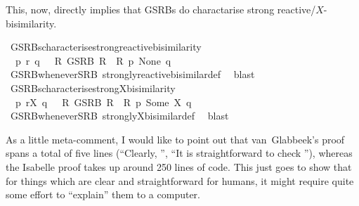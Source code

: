 \begin{isabellebody}
\endisatagproof
{\isafoldproof}%
%
\isadelimproof
%
\endisadelimproof
%
\begin{isamarkuptext}%
This, now, directly implies that GSRBs do charactarise strong reactive/$X$-bisimilarity.%
\end{isamarkuptext}\isamarkuptrue%
%
\isadelimvisible
%
\endisadelimvisible
%
\isatagvisible
{}\isamarkupfalse%
\ GSRBs{\isacharunderscore}{\kern0pt}characterise{\isacharunderscore}{\kern0pt}strong{\isacharunderscore}{\kern0pt}reactive{\isacharunderscore}{\kern0pt}bisimilarity{\isacharcolon}{\kern0pt}\isanewline
\ \ {\isacartoucheopen}p\ {\isasymleftrightarrow}\isactrlsub r\ q\ {\isasymLongleftrightarrow}\ {\isacharparenleft}{\kern0pt}{\isasymexists}\ R{\isachardot}{\kern0pt}\ GSRB\ R\ {\isasymand}\ R\ p\ None\ q{\isacharparenright}{\kern0pt}{\isacartoucheclose}\isanewline
\ \ \isamarkupfalse%
\ GSRB{\isacharunderscore}{\kern0pt}whenever{\isacharunderscore}{\kern0pt}SRB\ strongly{\isacharunderscore}{\kern0pt}reactive{\isacharunderscore}{\kern0pt}bisimilar{\isacharunderscore}{\kern0pt}def\ \isamarkupfalse%
\ blast\isanewline
\isanewline
{}\isamarkupfalse%
\ GSRBs{\isacharunderscore}{\kern0pt}characterise{\isacharunderscore}{\kern0pt}strong{\isacharunderscore}{\kern0pt}X{\isacharunderscore}{\kern0pt}bisimilarity{\isacharcolon}{\kern0pt}\isanewline
\ \ {\isacartoucheopen}p\ {\isasymleftrightarrow}\isactrlsub r\isactrlsup X\ q\ {\isasymLongleftrightarrow}\ {\isacharparenleft}{\kern0pt}{\isasymexists}\ R{\isachardot}{\kern0pt}\ GSRB\ R\ {\isasymand}\ R\ p\ {\isacharparenleft}{\kern0pt}Some\ X{\isacharparenright}{\kern0pt}\ q{\isacharparenright}{\kern0pt}{\isacartoucheclose}\isanewline
\ \ \isamarkupfalse%
\ GSRB{\isacharunderscore}{\kern0pt}whenever{\isacharunderscore}{\kern0pt}SRB\ strongly{\isacharunderscore}{\kern0pt}X{\isacharunderscore}{\kern0pt}bisimilar{\isacharunderscore}{\kern0pt}def\ \isamarkupfalse%
\ blast%
\endisatagvisible
{\isafoldvisible}%
%
\isadelimvisible
%
\endisadelimvisible
\isanewline
\isanewline
{}\isamarkupfalse%
\ %
%
\begin{isamarkuptext}%
As a little meta-comment, I would like to point out that van~Glabbeek's proof spans a total of five lines (\enquote{Clearly, \textelp{}}, \enquote{It is straightforward to check \textelp{}}), whereas the Isabelle proof takes up around 250 lines of code. This just goes to show that for things which are clear and straightforward for humans, it might require quite some effort to \enquote{explain} them to a computer.%
\end{isamarkuptext}\isamarkuptrue%
%
\isadelimtheory
%
\endisadelimtheory
%
\isatagtheory
%
\endisatagtheory
{\isafoldtheory}%
%
\isadelimtheory
%
\endisadelimtheory
%
\end{isabellebody}%

